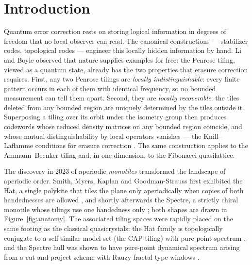 \documentclass[a4paper,unpublished]{quantumarticle}
\theoremstyle{remark}
\begin{document}
\section{Introduction}
\label{sec:intro}

Quantum error correction rests on storing logical information in
degrees of freedom that no local observer can read. The canonical
constructions --- stabilizer codes, topological codes --- engineer
this locally hidden information by hand. Li and Boyle
\cite{LiBoyle2024} observed that nature supplies examples for free:
the Penrose tiling, viewed as a quantum state, already has the two
properties that erasure correction requires. First, any two Penrose
tilings are \emph{locally indistinguishable}: every finite pattern
occurs in each of them with identical frequency, so no bounded
measurement can tell them apart. Second, they are \emph{locally
recoverable}: the tiles deleted from any bounded region are uniquely
determined by the tiles outside it. Superposing a tiling over its
orbit under the isometry group then produces codewords whose reduced
density matrices on any bounded region coincide, and whose mutual
distinguishability by local operators vanishes --- the Knill--Laflamme
conditions for erasure correction \cite{LiBoyle2024}. The same
construction applies to the Ammann--Beenker tiling and, in one
dimension, to the Fibonacci quasilattice.

The discovery in 2023 of aperiodic \emph{monotiles} transformed the
landscape of aperiodic order. Smith, Myers, Kaplan and Goodman-Strauss
first exhibited the Hat, a single polykite that tiles the plane only
aperiodically when copies of both handednesses are allowed
\cite{Smith2024hat}, and shortly afterwards the Spectre, a strictly
chiral monotile whose tilings use one handedness only
\cite{Smith2024spectre}; both shapes are drawn in
Figure~\ref{fig:anatomy}. The associated tiling spaces were rapidly
placed on the same footing as the classical quasicrystals: the Hat
family is topologically conjugate to a self-similar model set (the
CAP tiling) with pure-point spectrum \cite{BGS2025}, and the Spectre
hull was shown to have pure-point dynamical spectrum arising from a
cut-and-project scheme with Rauzy-fractal-type windows
\cite{BGMS2025}.
\end{document}
